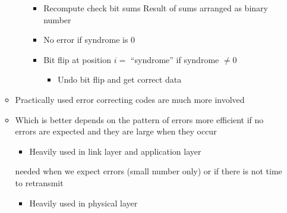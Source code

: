 \begin{itemize}
\begin{itemize}
\begin{itemize}
                        \begin{itemize}
                            \item Recompute check bit sums
                             Result of sums arranged as binary number
                            \item No error if syndrome is $0$
                            \item Bit flip at position $i =$ ``syndrome'' if syndrome $\neq 0$
                                \begin{itemize}
                                    \item Undo bit flip and get correct data
                                \end{itemize}
                        \end{itemize}
                \end{itemize}
            \item Practically used error correcting codes are much more involved
        \end{itemize}
        \begin{itemize}
            \item Which is better depends on the pattern of errors
             more efficient if no errors are expected and they are large when they occur
                \begin{itemize}
                    \item Heavily used in link layer and application layer
                \end{itemize}
             needed when we expect errors (small number only) or if there is not time to retransmit
                \begin{itemize}
                    \item Heavily used in physical layer
                \end{itemize}
        \end{itemize}
\end{itemize}
